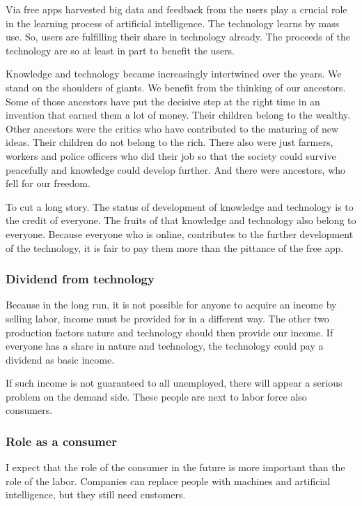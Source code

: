 \documentclass[11pt]{article}
\begin{document}
Via free apps harvested big data and feedback from the users play a crucial role in the learning process of artificial intelligence. The technology learns by mass use. So, users are fulfilling their share in technology already. The proceeds of the technology are so at least in part to benefit the users.

Knowledge and technology became increasingly intertwined over the years. We stand on the shoulders of giants. We benefit from the thinking of our ancestors. Some of those ancestors have put the decisive step at the right time in an invention that earned them a lot of money. Their children belong to the wealthy. Other ancestors were the critics who have contributed to the maturing of new ideas. Their children do not belong to the rich. There also were just farmers, workers and police officers who did their job so that the society could survive peacefully and knowledge could develop further. And there were ancestors, who fell for our freedom.

To cut a long story. The status of development of knowledge and technology is to the credit of everyone. The fruits of that knowledge and technology also belong to everyone. Because everyone who is online, contributes to the further development of the technology, it is fair to pay them more than the pittance of the free app.

\subsubsection{Dividend from technology}
\label{sec:orgf9e935a}

Because in the long run, it is not possible for anyone to acquire an income by selling labor, income must be provided for in a different way. The other two production factors nature and technology should then provide our income. If everyone has a share in nature and technology, the technology could pay a dividend as basic income.

If such income is not guaranteed to all unemployed, there will appear a serious problem on the demand side. These people are next to labor force also consumers.

\subsubsection{Role as a consumer}
\label{sec:org631ef13}

I expect that the role of the consumer in the future is more important than the role of the labor. Companies can replace people with machines and artificial intelligence, but they still need customers.
\end{document}
